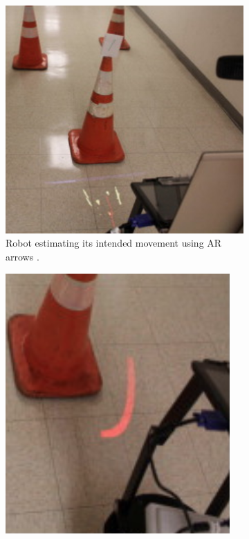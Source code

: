 \begin{figure}[ht]
    \centering
    \begin{subfigure}[b]{0.4\textwidth}
        \centering
        \includegraphics[width=\textwidth]{ch2/figs/robot_nav2.png}
        \caption{Robot estimating its intended movement using AR arrows \cite{Coovert2014}.}
        \label{fig:estimating_path}
    \end{subfigure}
    \hspace{0.05\textwidth} %
    \begin{subfigure}[b]{0.32\textwidth}
        \centering
        \includegraphics[width=\textwidth]{ch2/figs/robot_nav_1.png}

\end{subfigure}
\end{figure}
